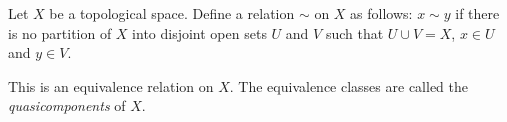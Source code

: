 \documentclass[12pt]{article}
\begin{document}
Let $X$ be a topological space.  Define a relation $\sim$ on $X$ as follows:  $x\sim y$ if there is no partition of $X$ into disjoint open sets $U$ and $V$ such that $U \cup V=X$, $x\in U$ and $y\in V$.

This is an equivalence relation on $X$.  The equivalence classes are called the \emph{quasicomponents} of $X$.
\end{document}
